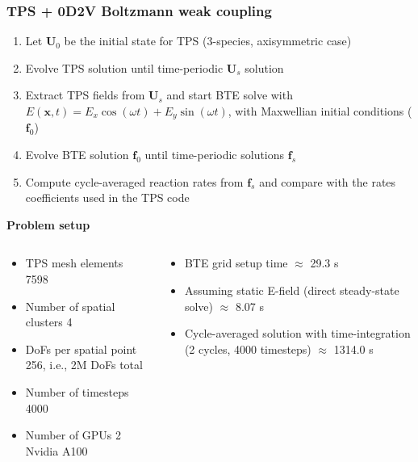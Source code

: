 \documentclass[mathserif, aspectratio=169]{beamer}
\newcommand{\vect}[1]{\boldsymbol{#1}}
\begin{document}
\begin{frame}
	\frametitle{TPS + 0D2V Boltzmann weak coupling}
	\vspace{-0.2in}
	\begin{enumerate}
		\item Let $\vect{U}_0$ be the initial state for TPS (3-species, axisymmetric case)
		\item Evolve TPS solution until time-periodic $\vect{U}_{s}$ solution
		\item Extract TPS fields from $\vect{U}_s$ and start BTE solve with $E(\vect{x}, t) = E_x \cos(\omega t) + E_y \sin(\omega t)$, with Maxwellian initial conditions ($\vect{f}_0$)
		\item Evolve BTE solution $\vect{f}_0$ until time-periodic solutions $\vect{f}_s$
		\item Compute cycle-averaged reaction rates from $\vect{f}_s$ and compare with the rates coefficients used in the TPS code
	\end{enumerate}
\pause
\textbf{Problem setup}
\begin{columns}
	\begin{column}{0.35\textwidth}

		\begin{itemize}
			\item TPS mesh elements 7598
			\item Number of spatial clusters 4
			\item DoFs per spatial point 256, i.e.,  2M DoFs total
			\item Number of timesteps 4000
			\item Number of GPUs 2 Nvidia A100
		\end{itemize}		
	\end{column}
	\begin{column}{0.7\textwidth}
		\begin{itemize}
			\item BTE grid setup time $\approx$ 29.3 s
			\item Assuming static E-field (direct steady-state solve) $\approx$ 8.07 s
			\item Cycle-averaged solution with time-integration (2 cycles, 4000 timesteps) $\approx$ 1314.0 s
		\end{itemize}
	\end{column}
\end{columns}

\end{frame}
\end{document}
